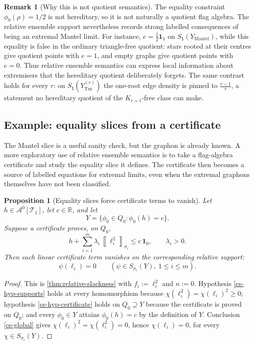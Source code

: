 \documentclass[11pt]{article}
\newtheorem{proposition}[proposition]{Proposition}
\theoremstyle{definition}
\newtheorem{remark}[remark]{Remark}
\newcommand{\R}{\mathbb{R}}
\newcommand{\A}{\mathcal{A}}
\newcommand{\T}{\mathcal{T}}
\newcommand{\avg}[2]{\left\llbracket #1 \right\rrbracket_{#2}}
\newcommand{\one}{\mathbf 1}
\newcommand{\vtype}{\mathsf{1}}
\begin{document}
\begin{remark}[Why this is not quotient semantics]
The equality constraint $\phi_0(\rho)=1/2$ is not hereditary, so it is not naturally a
quotient flag algebra.  The relative ensemble support nevertheless records strong
labelled consequences of being an extremal Mantel limit.  For instance,
$e=\frac12\one_{\vtype}$ on $S_{\vtype}(Y_{\mathrm{Mantel}})$, while this equality is false in the
ordinary triangle-free quotient: stars rooted at their centres give quotient points
with $e=1$, and empty graphs give quotient points with $e=0$.  Thus relative ensemble semantics can express
local information about extremisers that the hereditary quotient deliberately forgets.
The same contrast holds for every $r$: on $S_{\vtype}(Y_{\mathrm{Tur}}^{(r)})$ the
one-root edge density is pinned to $\frac{r-1}r$, a statement no hereditary quotient of
the $K_{r+1}$-free class can make.
\end{remark}

\subsection{Example: equality slices from a certificate}

The Mantel slice is a useful sanity check, but the graphon is already known.  A more
exploratory use of relative ensemble semantics is to take a flag-algebra certificate and
study the equality slice it defines.  The certificate then becomes a source of labelled
equations for extremal limits, even when the extremal graphons themselves have not been
classified.

\begin{proposition}[Equality slices force certificate terms to vanish]\label{prop:equality-slice-vanishing}
Let $h\in\A^0[\T_1]$, let $c\in\R$, and let
\[
  Y=\{\phi_0\in Q_0:\phi_0(h)=c\}.
\]
Suppose a certificate proves, on $Q_0$,
\[
  h+\sum_{i=1}^m \lambda_i\,\avg{\ell_i^2}{\sigma_i}\le c\,\one_0,
  \qquad
  \lambda_i>0 .
\]
Then each linear certificate term vanishes on the corresponding relative support:
\[
  \psi(\ell_i)=0
  \qquad
  (\psi\in S_{\sigma_i}(Y),\ 1\le i\le m).
\]
\end{proposition}

\begin{proof}
This is \cref{thm:relative-slackness} with $f_i:=\ell_i^2$ and $n:=0$.  Hypothesis
\ref{cs-hyp-supports} holds at every homomorphism because
$\chi(\ell_i^2)=\chi(\ell_i)^2\ge0$; hypothesis \ref{cs-hyp-certificate} holds on
$Q_0\supseteq Y$ because the certificate is proved on $Q_0$; and every $\phi_0\in Y$
attains $\phi_0(h)=c$ by the definition of $Y$.  Conclusion \ref{cs-global} gives
$\chi(\ell_i)^2=\chi(\ell_i^2)=0$, hence $\chi(\ell_i)=0$, for every
$\chi\in S_{\sigma_i}(Y)$.
\end{proof}
\end{document}
